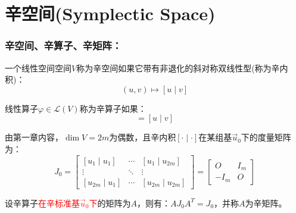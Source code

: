 \documentclass[zihao=-4,UTF8]{report}
\theoremstyle{mystyle} %
\begin{document}
\section{辛空间(Symplectic Space)}
\subsubsection{辛空间、辛算子、辛矩阵：}
一个线性空间空间$V$称为辛空间如果它带有非退化的斜对称双线性型(称为辛内积)：
\begin{equation*}
    (u,v) \longmapsto [u\mid v]
\end{equation*}\par

线性算子$\varphi \in \mathscr{L}(V)$称为辛算子如果：
\begin{equation*}
    [\varphi(u)\mid \varphi(v)] = [u\mid v]
\end{equation*}\par
{\color{gray}\small
由第一章内容，$\dim V = 2m$为偶数，且辛内积$[\cdot \mid \cdot]$在某组基$\vec{u}_0$下的度量矩阵为：
\begin{equation*}
    J_0 = \begin{bmatrix}  
        [u_1\mid u_1] & \cdots & [u_1\mid u_{2m}]  \\  
        \vdots & \ddots & \vdots \\  
        [u_{2m}\mid u_1] & \cdots &  [u_{2m}\mid u_{2m}] 
      \end{bmatrix} =
      \begin{bmatrix}
        O & I_m\\
        -I_m & O
      \end{bmatrix}
\end{equation*}
}\par   
设辛算子\textcolor{red}{在辛标准基$\vec{u}_0$下}的矩阵为$A$，则有：$AJ_0A^T = J_0$，并称$A$为辛矩阵。
\end{document}

